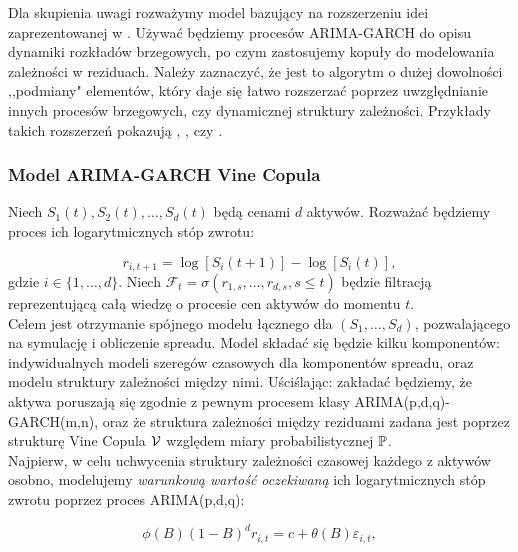 Dla skupienia uwagi rozważymy model bazujący na rozszerzeniu idei zaprezentowanej w \cite{Herath_Copula_Crack_Spread}. Używać będziemy procesów ARIMA-GARCH do opisu dynamiki rozkładów brzegowych, po czym zastosujemy kopuły do modelowania zależności w reziduach. Należy zaznaczyć, że jest to algorytm o dużej dowolności ,,podmiany" elementów, który daje się łatwo rozszerzać poprzez uwzględnianie innych procesów brzegowych, czy dynamicznej struktury zależności. Przykłady takich rozszerzeń pokazują \cite{Espen_Crack_Spread_Copula}, \cite{Herath_Copula_Crack_Spread}, \cite{Bernard_Pricing_Multivariate_Options_with_copulae} czy \cite{Sukcharoen2017}.\\

\subsubsection{Model ARIMA-GARCH Vine Copula}
Niech $S_1(t), S_2(t), \dots, S_d(t)$ będą cenami $d$ aktywów. Rozważać będziemy proces ich logarytmicznych stóp zwrotu:

\begin{equation}
	r_{i, t+1} = \log[S_i(t+1)] - \log[S_i(t)],
	\label{eq:logreturn}
\end{equation}
gdzie $i\in\{1,\dots, d\}$. Niech $\mathcal{F}_t = \sigma(r_{1,s}, \dots, r_{d,s}, s\leqslant t)$ będzie filtracją reprezentującą całą wiedzę o procesie cen aktywów do momentu $t$.\\

Celem jest otrzymanie spójnego modelu łącznego dla $(S_1, \dots, S_d)$, pozwalającego na symulację i obliczenie spreadu. Model składać się będzie kilku komponentów: indywidualnych modeli szeregów czasowych dla komponentów spreadu, oraz modelu struktury zależności między nimi. Uściślając: zakładać będziemy, że aktywa poruszają się zgodnie z pewnym procesem klasy ARIMA(p,d,q)-GARCH(m,n), oraz że struktura zależności między reziduami zadana jest poprzez strukturę Vine Copula $\mathcal{V}$ względem miary probabilistycznej $\mathbb{P}$.\\

Najpierw, w celu uchwycenia struktury zależności czasowej każdego z aktywów osobno, modelujemy \emph{warunkową wartość oczekiwaną} ich logarytmicznych stóp zwrotu poprzez proces ARIMA(p,d,q):

\begin{equation}
	\phi(B)(1-B)^d r_{i, t} = c + \theta(B)\varepsilon_{i, t},
	\label{eq:arima_part}
\end{equation}

